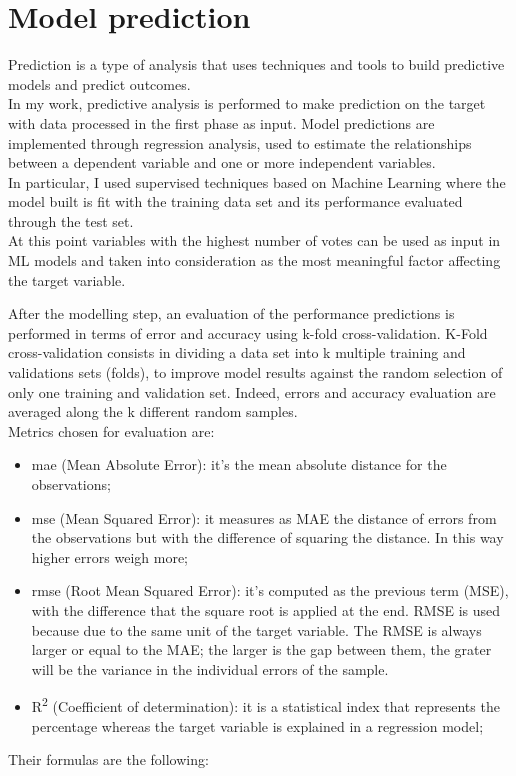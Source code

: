 \section{Model prediction}
Prediction is a type of analysis that uses techniques and tools to build predictive models and predict outcomes. \\
In my work, predictive analysis is performed to make prediction on the target with data processed in the first phase as input.\newline
Model predictions are implemented through regression analysis, used to estimate the relationships between a dependent variable and one or more independent variables.\\
In particular, I used supervised techniques based on Machine Learning where the model built is fit with the training data set and its performance evaluated through the test set. 
\\
At this point variables with the highest number of votes can be used as input in ML models and taken into consideration as the most meaningful factor affecting the target variable.
\par
After the modelling step, an evaluation of the performance predictions is performed in terms of error and accuracy using k-fold cross-validation.\newline
K-Fold cross-validation consists in dividing a data set into k multiple training and validations sets (folds), to improve model results against the random selection of only one training and validation set. Indeed, errors and accuracy evaluation are averaged along the k different random samples.\\
Metrics chosen for evaluation are:
\begin{itemize}
    \item \acrshort{mae} (Mean Absolute Error): it's the mean absolute distance for the observations;
    \item \acrshort{mse} (Mean Squared Error): it measures as MAE the distance of errors from the observations but with the difference of squaring the distance. In this way higher errors weigh more;
    \item \acrshort{rmse} (Root Mean Squared Error): it's computed as the previous term (MSE), with the difference that the square root is applied at the end. RMSE is used because due to the same unit of the target variable.
    The RMSE is always larger or equal to the MAE; the larger is the gap between them, the grater will be the variance in the individual errors of the sample.
    \item R\textsuperscript{2} (Coefficient of determination): it is a statistical index that represents the percentage whereas the target variable is explained in a regression model;
\end{itemize} 
Their formulas are the following:

